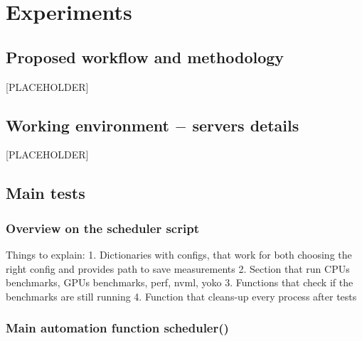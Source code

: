 \chapter{Experiments}

\section{Proposed workflow and methodology}

[PLACEHOLDER]


\section{Working environment $-$ servers details}

[PLACEHOLDER]

\section{Main tests}

\subsection{Overview on the scheduler script}

Things to explain:
1. Dictionaries with configs, that work for both choosing the right config and
provides path to save measurements
2. Section that run CPUs benchmarks, GPUs benchmarks, perf, nvml, yoko
3. Functions that check if the benchmarks are still running
4. Function that cleans-up every process after tests


\subsection{Main automation function \- scheduler()}



